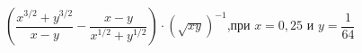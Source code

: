 \begin{ex}[type=simplify_calculate]
	\begin{condition}
		\( \left( \dfrac{x^{3/2}+y^{3/2}}{x-y}-\dfrac{x-y}{x^{1/2}+y^{1/2}} \right)\cdot(\sqrt{xy})^{-1} \),\quad при \( x=0,25 \) и \( y=\dfrac{1}{64} \)
	\end{condition}
\end{ex}